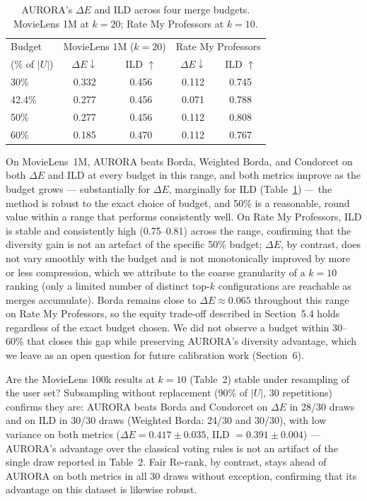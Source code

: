 \documentclass[a4paper,fleqn]{cas-dc}
\begin{document}
\begin{table}[h!]
\caption{AURORA's $\Delta E$ and ILD across four merge budgets.
MovieLens 1M at $k=20$; Rate My Professors at $k=10$.}
\label{tab:robustness}
\centering
{
\setlength{\tabcolsep}{3pt}
\begin{tabular}{lcccc}
\hline
Budget   & \multicolumn{2}{c}{MovieLens 1M ($k=20$)} &
\multicolumn{2}{c}{Rate My Professors} \\
($\%$ of $|U|$) & $\Delta E \downarrow$ & ILD $\uparrow$ & $\Delta E \downarrow$ &
ILD $\uparrow$ \\
\hline
30\%   & 0.332 & 0.456 & 0.112 & 0.745 \\
42.4\% & 0.277 & 0.456 & 0.071 & 0.788 \\
50\%   & 0.277 & 0.456 & 0.112 & 0.808 \\
60\%   & 0.185 & 0.470 & 0.112 & 0.767 \\
\hline
\end{tabular}
}
\end{table}

On MovieLens~1M, AURORA beats Borda, Weighted Borda, and Condorcet on both
$\Delta E$ and ILD at every budget in this range, and both metrics improve
as the budget grows — substantially for $\Delta E$, marginally for ILD
(Table~\ref{tab:robustness}) — the
method is robust to the exact choice of budget, and 50\% is a reasonable,
round value within a range that performs consistently well. On Rate My Professors, ILD is stable and
consistently high (0.75--0.81) across the range, confirming that the
diversity gain is not an artefact of the specific 50\% budget; $\Delta E$,
by contrast, does not vary smoothly with the budget and is not
monotonically improved by more or less compression, which we attribute to
the coarse granularity of a $k=10$ ranking (only a limited number of
distinct top-$k$ configurations are reachable as merges accumulate). Borda
remains close to $\Delta E \approx 0.065$ throughout this range on Rate My
Professors, so the equity trade-off described in Section~5.4 holds
regardless of the exact budget chosen. We did not observe a budget within
30--60\% that closes this gap while preserving AURORA's diversity
advantage, which we leave as an open question for future calibration
work (Section~6).

Are the MovieLens 100k results at $k=10$ (Table~2) stable under
resampling of the user set? Subsampling without replacement (90\% of
$|U|$, 30 repetitions) confirms they are: AURORA beats Borda and
Condorcet on $\Delta E$ in 28/30 draws and on ILD in 30/30 draws
(Weighted Borda: 24/30 and 30/30), with low variance on both metrics
($\Delta E = 0.417 \pm 0.035$, ILD $= 0.391 \pm 0.004$) --- AURORA's
advantage over the classical voting rules is not an artifact of the
single draw reported in Table~2. Fair Re-rank, by contrast, stays ahead
of AURORA on both metrics in all 30 draws without exception, confirming
that its advantage on this dataset is likewise robust.
\end{document}
